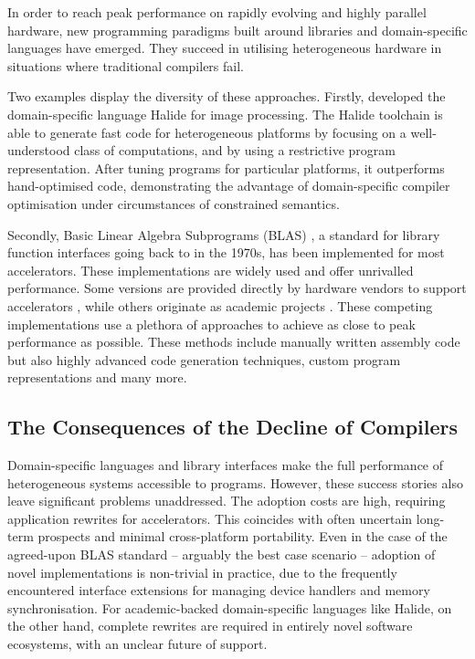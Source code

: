     In order to reach peak performance on rapidly evolving and highly parallel
    hardware, new programming paradigms built around libraries and
    domain-specific languages have emerged.
    They succeed in utilising heterogeneous hardware in situations where
    traditional compilers fail.

    Two examples display the diversity of these approaches.
    Firstly, \citet{Ragan-Kelley2013Halide} developed the domain-specific
    language Halide for image processing.
    The Halide toolchain is able to generate fast code for heterogeneous
    platforms by focusing on a well-understood class of computations, and by
    using a restrictive program representation.
    After tuning programs for particular platforms, it outperforms
    hand-optimised code, demonstrating the advantage of domain-specific compiler
    optimisation under circumstances of constrained semantics.

    Secondly, Basic Linear Algebra Subprograms (BLAS)
    \citep{2002:USB:567806.567807}, a standard for library function interfaces
    going back to \citet{Lawson:1979:BLA:355841.355847} in the 1970s, has been
    implemented for most accelerators.
    These implementations are widely used and offer unrivalled performance.
    Some versions are provided directly by hardware vendors to support
    accelerators \citep{mkl,cublas,clblas,apl,qml}, while others originate as
    academic projects \citep{Wang:2013:AAG:2503210.2503219}.
    These competing implementations use a plethora of approaches to achieve as
    close to peak performance as possible.
    These methods include manually written assembly code but also highly
    advanced code generation techniques, custom program representations and
    many more.

\subsection{The Consequences of the Decline of Compilers}

    Domain-specific languages and library interfaces make the full performance
    of heterogeneous systems accessible to programs.
    However, these success stories also leave significant problems unaddressed.
    The adoption costs are high, requiring application rewrites for
    accelerators.
    This coincides with often uncertain long-term prospects and minimal
    cross-platform portability.
    Even in the case of the agreed-upon BLAS standard -- arguably the best case
    scenario -- adoption of novel implementations is non-trivial in practice,
    due to the frequently encountered interface extensions for managing device
    handlers and memory synchronisation.
    For academic-backed domain-specific languages like Halide, on the other
    hand, complete rewrites are required in entirely novel software ecosystems,
    with an unclear future of support.

